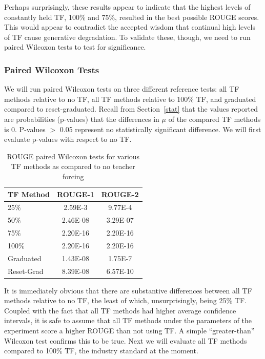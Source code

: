 Perhaps surprisingly, these results appear to indicate that the highest levels of constantly held TF, 100\% and 75\%, resulted in the best possible ROUGE scores. This would appear to contradict the accepted wisdom that continual high levels of TF cause generative degradation. To validate these, though, we need to run paired Wilcoxon tests to test for significance.

\subsubsection{Paired Wilcoxon Tests}
We will run paired Wilcoxon tests on three different reference tests: all TF methods relative to no TF, all TF methods relative to 100\% TF, and graduated compared to reset-graduated. Recall from Section~\ref{stat} that the values reported are probabilities (p-values) that the differences in $\mu$ of the compared TF methods is 0. P-values $>$ 0.05 represent no statistically significant difference. We will first evaluate p-values with respect to no TF.

\begin{table}[h]
  \centering
  \begin{tabular}{| l | c | c |}
    \hline
    TF Method & ROUGE-1 & ROUGE-2 \\
    \hline
    25\% & 2.59E-3 & 9.77E-4  \\
    50\% & 2.46E-08 & 3.29E-07  \\
    75\% & 2.20E-16 & 2.20E-16  \\
    100\% & 2.20E-16 & 2.20E-16  \\
    Graduated & 1.43E-08 & 1.75E-7 \\
    Reset-Grad & 8.39E-08 & 6.57E-10  \\
    \hline
  \end{tabular}
  \caption{ROUGE paired Wilcoxon tests for various TF methods as compared to no teacher forcing}
  \label{tab:pairedNone}
\end{table}

It is immediately obvious that there are substantive differences between all TF methods relative to no TF, the least of which, unsurprisingly, being 25\% TF. Coupled with the fact that all TF methods had higher average confidence intervals, it is safe to assume that all TF methods under the parameters of the experiment score a higher ROUGE than not using TF. A simple ``greater-than'' Wilcoxon test confirms this to be true. Next we will evaluate all TF methods compared to 100\% TF, the industry standard at the moment.

